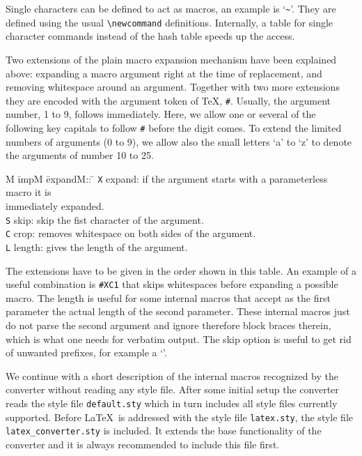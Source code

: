 \documentclass[11pt]{article}
\begin{document}
Single characters can be defined to act as macros, an example is
`\verb+~+'.  They are defined using the usual \verb+\newcommand+
definitions. Internally, a table for single character commands instead
of the hash table speeds up the access.

Two extensions of the plain macro expansion mechanism have been
explained above: expanding a macro argument right at the time of
replacement, and removing whitespace around an argument. Together
with two more extensions they are encoded with the argument token of
\TeX, {\tt \#}. Usually, the argument number, 1 to 9, follows
immediately. Here, we allow one or several of the following key
capitals to follow {\tt \#} before the digit comes. To extend the
limited numbers of arguments (0 to 9), we allow also the small letters
`a' to `z' to denote the arguments of number 10 to 25.

\begin{tabbing}
  M \= impM \= expandM:: \= \kill
  \> \verb+X+ \> expand: \> if the argument starts with a parameterless macro 
                            it is\\ \> \> \> immediately expanded.\\
  \> \verb+S+ \> skip:   \> skip the fist character of the argument.\\
  \> \verb+C+ \> crop:   \> removes whitespace on both sides of the 
                            argument.\\
  \> \verb+L+ \> length: \> gives the length of the argument.
\end{tabbing}

The extensions have to be given in the order shown in this table. An
example of a useful combination is {\tt \#XC1} that skips whitespaces
before expanding a possible macro. The length is useful for some
internal macros that accept as the first parameter the actual length
of the second parameter.  These internal macros just do not parse the
second argument and ignore therefore block braces therein, which is
what one needs for verbatim output. The skip option is useful to get
rid of unwanted prefixes, for example a `{\tt \Backslash}'.

We continue with a short description of the internal macros recognized
by the converter without reading any style file. After some initial
setup the converter reads the style file {\tt default.sty} which in
turn includes all style files currently supported. Before \LaTeX\ is
addressed with the style file {\tt latex.sty}, the style file {\tt
  latex\_converter.sty} is included. It extends the base functionality
of the converter and it is always recommended to include this file
first.
\end{document}
